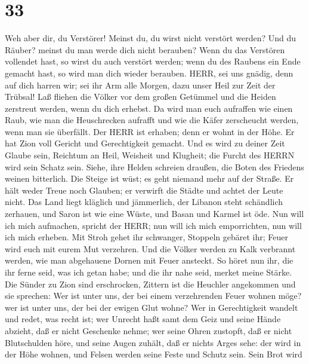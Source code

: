 \hypertarget{section-32}{%
\section{33}\label{section-32}}

 Weh aber dir, du Verstörer! Meinst du, du wirst nicht
verstört werden? Und du Räuber? meinst du man werde dich nicht berauben?
Wenn du das Verstören vollendet hast, so wirst du auch verstört werden;
wenn du des Raubens ein Ende gemacht hast, so wird man dich wieder
berauben.  HERR, sei uns gnädig, denn auf dich harren wir;
sei ihr Arm alle Morgen, dazu unser Heil zur Zeit der Trübsal!
 Laß fliehen die Völker vor dem großen Getümmel und die
Heiden zerstreut werden, wenn du dich erhebst.  Da wird man
euch aufraffen wie einen Raub, wie man die Heuschrecken aufrafft und wie
die Käfer zerscheucht werden, wenn man sie überfällt.  Der
HERR ist erhaben; denn er wohnt in der Höhe. Er hat Zion voll Gericht
und Gerechtigkeit gemacht.  Und es wird zu deiner Zeit
Glaube sein, Reichtum an Heil, Weisheit und Klugheit; die Furcht des
HERRN wird sein Schatz sein.  Siehe, ihre Helden schreien
draußen, die Boten des Friedens weinen bitterlich.  Die
Steige ist wüst; es geht niemand mehr auf der Straße. Er hält weder
Treue noch Glauben; er verwirft die Städte und achtet der Leute nicht.
 Das Land liegt kläglich und jämmerlich, der Libanon steht
schändlich zerhauen, und Saron ist wie eine Wüste, und Basan und Karmel
ist öde.  Nun will ich mich aufmachen, spricht der HERR;
nun will ich mich emporrichten, nun will ich mich erheben. 
Mit Stroh gehet ihr schwanger, Stoppeln gebäret ihr; Feuer wird euch mit
eurem Mut verzehren.  Und die Völker werden zu Kalk
verbrannt werden, wie man abgehauene Dornen mit Feuer ansteckt.
 So höret nun ihr, die ihr ferne seid, was ich getan habe;
und die ihr nahe seid, merket meine Stärke.  Die Sünder zu
Zion sind erschrocken, Zittern ist die Heuchler angekommen und sie
sprechen: Wer ist unter uns, der bei einem verzehrenden Feuer wohnen
möge? wer ist unter uns, der bei der ewigen Glut wohne? 
Wer in Gerechtigkeit wandelt und redet, was recht ist; wer Unrecht haßt
samt dem Geiz und seine Hände abzieht, daß er nicht Geschenke nehme; wer
seine Ohren zustopft, daß er nicht Blutschulden höre, und seine Augen
zuhält, daß er nichts Arges sehe:  der wird in der Höhe
wohnen, und Felsen werden seine Feste und Schutz sein. Sein Brot wird
